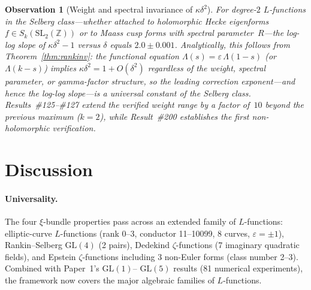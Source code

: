 \documentclass[11pt, a4paper]{article}
\theoremstyle{plain}
\newtheorem{observation}[theorem]{Observation}
\theoremstyle{definition}
\begin{document}
\begin{observation}[Weight and spectral invariance of $\kappa\delta^{2}$]
\label{obs:weightinv}
  For degree-$2$ $L$-functions in the Selberg class---whether attached to
  holomorphic Hecke eigenforms $f\in S_k(\mathrm{SL}_2(\mathbb{Z}))$ or
  to Maass cusp forms with spectral parameter~$R$---the log-log slope of
  $\kappa\delta^{2}-1$ versus $\delta$ equals $2.0\pm 0.001$.
  Analytically, this follows from Theorem~\ref{thm:rankinv}: the functional
  equation $\Lambda(s)=\varepsilon\,\Lambda(1{-}s)$ (or $\Lambda(k{-}s)$)
  implies $\kappa\delta^{2}=1+O(\delta^{2})$ regardless of the weight,
  spectral parameter, or gamma-factor structure, so the leading correction
  exponent---and hence the log-log slope---is a \emph{universal constant}
  of the Selberg class.  Results~\#125--\#127 extend the verified weight
  range by a factor of~$10$ beyond the previous maximum ($k=2$), while
  Result~\#200 establishes the first non-holomorphic verification.
\end{observation}


\section{Discussion}
\label{sec:disc}

\paragraph{Universality.}
The four $\xi$-bundle properties pass across an extended family of
$L$-functions: elliptic-curve $L$-functions (rank 0--3, conductor
11--10099, 8 curves, $\varepsilon=\pm 1$), Rankin--Selberg
$\mathrm{GL}(4)$ (2 pairs), Dedekind $\zeta$-functions (7 imaginary
quadratic fields), and Epstein $\zeta$-functions including 3 non-Euler
forms (class number 2--3).  Combined with Paper~1's $\mathrm{GL}(1)$--
$\mathrm{GL}(5)$ results (81 numerical experiments), the framework now
covers the major algebraic families of $L$-functions.
\end{document}
